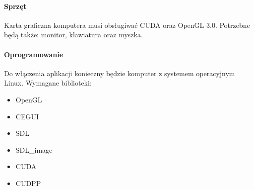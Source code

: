 \paragraph{Sprzęt}
Karta graficzna komputera musi obsługiwać CUDA oraz OpenGL 3.0. Potrzebne będą także: monitor, klawiatura oraz myszka.

\paragraph{Oprogramowanie}
Do włączenia aplikacji konieczny będzie komputer z systemem operacyjnym Linux. Wymagane biblioteki: 
\begin{itemize}
\item{OpenGL}
\item{CEGUI}
\item{SDL}
\item{SDL\_image}
\item{CUDA}
\item{CUDPP}
\end{itemize}


